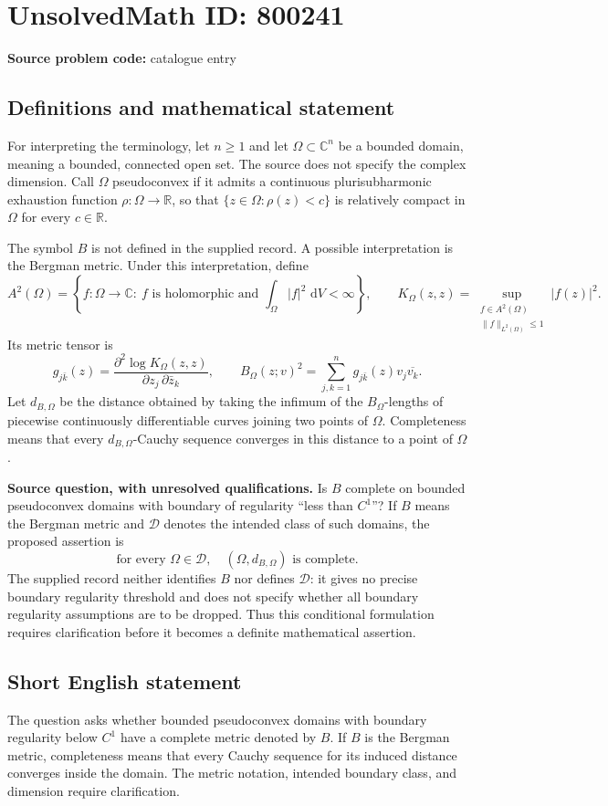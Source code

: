 \documentclass[11pt]{article}
\newcommand{\R}{\mathbb{R}}
\newcommand{\C}{\mathbb{C}}
\newcommand{\dd}{\,\mathrm{d}}
\begin{document}
\section*{UnsolvedMath ID: 800241}
\textbf{Source problem code:} catalogue entry
\subsection{Definitions and mathematical statement}
For interpreting the terminology, let \(n\geq 1\) and let \(\Omega\subset\C^n\) be a bounded domain, meaning a bounded, connected open set. The source does not specify the complex dimension. Call \(\Omega\) pseudoconvex if it admits a continuous plurisubharmonic exhaustion function \(\rho\colon\Omega\to\R\), so that \(\{z\in\Omega:\rho(z)<c\}\) is relatively compact in \(\Omega\) for every \(c\in\R\).

The symbol \(B\) is not defined in the supplied record. A possible interpretation is the Bergman metric. Under this interpretation, define
\[
A^2(\Omega)=\left\{f\colon\Omega\to\C:\ f\text{ is holomorphic and }\int_\Omega |f|^2\,\dd V<\infty\right\},
\qquad
K_\Omega(z,z)=\sup_{\substack{f\in A^2(\Omega)\\ \|f\|_{L^2(\Omega)}\leq 1}}|f(z)|^2.
\]
Its metric tensor is
\[
g_{j\bar k}(z)=\frac{\partial^2\log K_\Omega(z,z)}{\partial z_j\,\partial\bar z_k},
\qquad
B_\Omega(z;v)^2=\sum_{j,k=1}^n g_{j\bar k}(z)v_j\overline{v_k}.
\]
Let \(d_{B,\Omega}\) be the distance obtained by taking the infimum of the \(B_\Omega\)-lengths of piecewise continuously differentiable curves joining two points of \(\Omega\). Completeness means that every \(d_{B,\Omega}\)-Cauchy sequence converges in this distance to a point of \(\Omega\).

\textbf{Source question, with unresolved qualifications.} Is \(B\) complete on bounded pseudoconvex domains with boundary of regularity ``less than \(C^1\)''? If \(B\) means the Bergman metric and \(\mathcal D\) denotes the intended class of such domains, the proposed assertion is
\[
\text{for every }\Omega\in\mathcal D,\quad (\Omega,d_{B,\Omega})\text{ is complete}.
\]
The supplied record neither identifies \(B\) nor defines \(\mathcal D\): it gives no precise boundary regularity threshold and does not specify whether all boundary regularity assumptions are to be dropped. Thus this conditional formulation requires clarification before it becomes a definite mathematical assertion.
\subsection{Short English statement}
The question asks whether bounded pseudoconvex domains with boundary regularity below \(C^1\) have a complete metric denoted by \(B\). If \(B\) is the Bergman metric, completeness means that every Cauchy sequence for its induced distance converges inside the domain. The metric notation, intended boundary class, and dimension require clarification.
\end{document}
